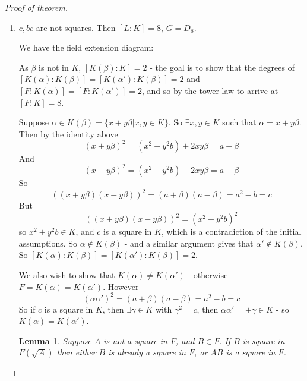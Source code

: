\documentclass{article}
\theoremstyle{definition}
\theoremstyle{plain}%
\newtheorem{lem}[thm]{Lemma}
\theoremstyle{remark}
\begin{document}
\begin{proof}[Proof of theorem]
    \begin{enumerate}
        \item $c, bc$ are not squares. Then $[L : K] = 8$, $G = D_8$.
        
        We have the field extension diagram:
        \begin{figure}[h]
            \centering
        \end{figure}
        
        As $\beta$ is not in $K$, $[K(\beta) : K] = 2$ - the goal is to show that the degrees of $[K(\alpha) : K(\beta)] = [K(\alpha') : K(\beta) ] = 2$ and $[F : K(\alpha)] = [F : K(\alpha')] = 2$, and so by the tower law to arrive at $[F : K] = 8$.

Suppose $\alpha \in K(\beta) = \{ x + y\beta | x, y \in K \}$. So $\exists x, y \in K$ such that $\alpha = x + y\beta$. Then by the identity above
\[(x + y\beta)^2 = (x^2 + y^2b) + 2xy\beta = a + \beta\]
And
\[(x - y\beta)^2 = (x^2 + y^2b) - 2xy\beta = a - \beta\]
So
\[((x + y\beta)(x - y\beta))^2 = (a + \beta)(a - \beta) = a^2 - b = c\]
But
\[((x + y\beta)(x - y\beta))^2 = (x^2 - y^2b)^2\]
so $x^2 + y^2b \in K$, and $c$ is a square in $K$, which is a contradiction of the initial assumptions. So $\alpha \not \in K(\beta)$ - and a similar argument gives that $\alpha' \not \in K(\beta)$. So $[K(\alpha) : K(\beta)] = [K(\alpha') : K(\beta)] = 2$.

We also wish to show that $K(\alpha) \ne K(\alpha')$ - otherwise $F = K(\alpha) = K(\alpha')$. However -
\[(\alpha\alpha')^2 = (a + \beta)(a - \beta) = a^2 - b = c\]
So if $c$ is a square in $K$, then $\exists \gamma \in K$ with $\gamma^2 = c$, then $\alpha\alpha' = \pm\gamma \in K$ - so $K(\alpha) = K(\alpha')$.
        
        \begin{lem}
            Suppose $A$ is not a square in $F$, and $B \in F$. If $B$ is square in $F(\sqrt{A})$ then either $B$ is already a square in $F$, or $AB$ is a square in $F$.
        \end{lem}
        

\end{enumerate}
\end{proof}
\end{document}

